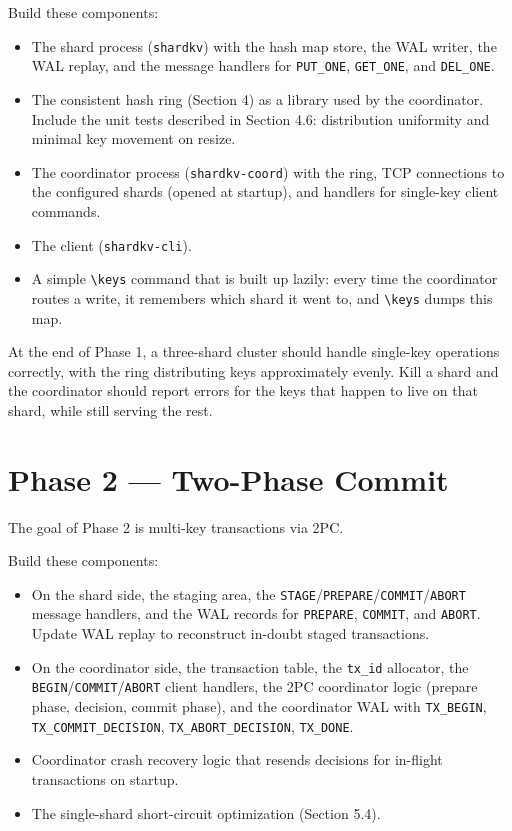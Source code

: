 \documentclass[11pt,a4paper]{article}
\begin{document}
Build these components:

\begin{itemize}
\item The shard process (\texttt{shardkv}) with the hash map store, the WAL writer, the WAL replay, and the message handlers for \texttt{PUT\_ONE}, \texttt{GET\_ONE}, and \texttt{DEL\_ONE}.

\item The consistent hash ring (Section 4) as a library used by the coordinator. Include the unit tests described in Section 4.6: distribution uniformity and minimal key movement on resize.

\item The coordinator process (\texttt{shardkv-coord}) with the ring, TCP connections to the configured shards (opened at startup), and handlers for single-key client commands.

\item The client (\texttt{shardkv-cli}).

\item A simple \verb|\keys| command that is built up lazily: every time the coordinator routes a write, it remembers which shard it went to, and \verb|\keys| dumps this map.
\end{itemize}

At the end of Phase 1, a three-shard cluster should handle single-key operations correctly, with the ring distributing keys approximately evenly. Kill a shard and the coordinator should report errors for the keys that happen to live on that shard, while still serving the rest.

\section{Phase 2 --- Two-Phase Commit}

The goal of Phase 2 is multi-key transactions via 2PC.

Build these components:

\begin{itemize}
\item On the shard side, the staging area, the \texttt{STAGE}/\texttt{PREPARE}/\texttt{COMMIT}/\texttt{ABORT} message handlers, and the WAL records for \texttt{PREPARE}, \texttt{COMMIT}, and \texttt{ABORT}. Update WAL replay to reconstruct in-doubt staged transactions.

\item On the coordinator side, the transaction table, the \texttt{tx\_id} allocator, the \texttt{BEGIN}/\texttt{COMMIT}/\texttt{ABORT} client handlers, the 2PC coordinator logic (prepare phase, decision, commit phase), and the coordinator WAL with \texttt{TX\_BEGIN}, \texttt{TX\_COMMIT\_DECISION}, \texttt{TX\_ABORT\_DECISION}, \texttt{TX\_DONE}.

\item Coordinator crash recovery logic that resends decisions for in-flight transactions on startup.

\item The single-shard short-circuit optimization (Section 5.4).
\end{itemize}
\end{document}

